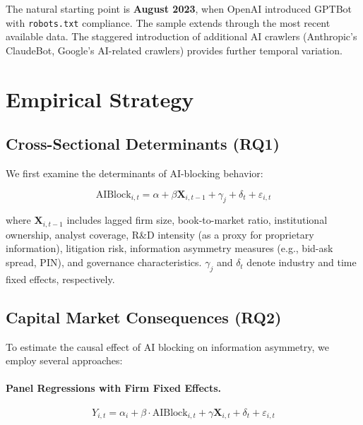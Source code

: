 \documentclass[12pt,a4paper]{article}
\begin{document}
The natural starting point is \textbf{August 2023}, when OpenAI introduced GPTBot with \texttt{robots.txt} compliance. The sample extends through the most recent available data. The staggered introduction of additional AI crawlers (Anthropic's ClaudeBot, Google's AI-related crawlers) provides further temporal variation.

\section{Empirical Strategy}

\subsection{Cross-Sectional Determinants (RQ1)}

We first examine the determinants of AI-blocking behavior:

\begin{equation}
\text{AIBlock}_{i,t} = \alpha + \beta \mathbf{X}_{i,t-1} + \gamma_j + \delta_t + \varepsilon_{i,t}
\end{equation}

\noindent where $\mathbf{X}_{i,t-1}$ includes lagged firm size, book-to-market ratio, institutional ownership, analyst coverage, R\&D intensity (as a proxy for proprietary information), litigation risk, information asymmetry measures (e.g., bid-ask spread, PIN), and governance characteristics. $\gamma_j$ and $\delta_t$ denote industry and time fixed effects, respectively.

\subsection{Capital Market Consequences (RQ2)}

To estimate the causal effect of AI blocking on information asymmetry, we employ several approaches:

\paragraph{Panel Regressions with Firm Fixed Effects.}
\begin{equation}
Y_{i,t} = \alpha_i + \beta \cdot \text{AIBlock}_{i,t} + \gamma \mathbf{X}_{i,t} + \delta_t + \varepsilon_{i,t}
\end{equation}
\end{document}
